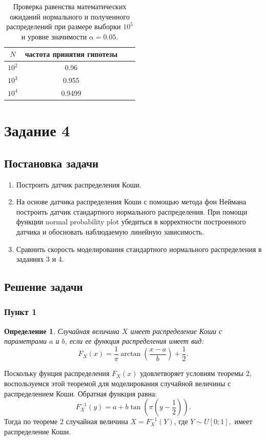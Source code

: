 \documentclass[oneside, final, 12pt]{article}
\newtheorem{definition}{Определение}
\begin{document}
	\begin{table}[h!]
	\begin{center}
		\begin{tabular}{|c|c|c|c|}
			\hline $N$ & частота принятия гипотезы \\ \hline
				$10^2$ & 0.96  \\ \hline
				$10^3$ & 0.955 \\ \hline
				$10^4$ & 0.9499 \\ \hline
		\end{tabular}
		\caption{ \centering  Проверка равенства математических ожиданий нормального 
											и полученного распределений при размере выборки $10^5$ 
											и уровне значимости $\alpha=0.05.$}
	\end{center}
	\end{table}
	


\section{Задание 4}

\subsection{Постановка задачи}
    \begin{enumerate} 
        \item Построить датчик распределения Коши. 
        \item На основе датчика распределения Коши с помощью метода фон Неймана построить датчик
			стандартного нормального распределения. При помощи функции normal probability plot 
			убедиться в корректности построенного датчика 
			и обосновать наблюдаемую линейную зависимость. 
        \item Сравнить скорость моделирования стандартного нормального распределения в заданиях 3 и 4. 
    \end{enumerate}

\subsection{Решение задачи}
\subsubsection{Пункт 1}

	\begin{definition}
		Случайная величина $X$ имеет распределение Коши с параметрами $a$ и $b$, 
		если ее функция распределения имеет вид:
		$$
			F_X(x) = \dfrac{1}{\pi}\arctan \left( \dfrac{x-a}{b} \right) + \dfrac{1}{2}.
		$$	
	\end{definition}
	Поскольку фунция распределения $F_X(x)$ удовлетворяет условиям теоремы 2, воспользуемся этой 
	теоремой для моделирования случайной величины с распределением Коши. Обратная функция равна:
	$$
		F_X^{-1}(y) = a + b \tan \left( \pi \left( y - \dfrac{1}{2} \right) \right).
	$$
	Тогда по теореме 2 случайная величина $X=F_X^{-1}(Y)$, где $Y\sim U[0;1],$ имеет распределение Коши.
\end{document}
